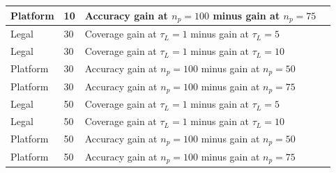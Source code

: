 \begin{longtable}{@{}L{23mm}C{15mm}L{122mm}R{56mm}@{}}
Platform & 10 & Accuracy gain at $n_p=100$ minus gain at $n_p=75$ &  \\
\midrule
Legal & 30 & Coverage gain at $\tau_L=1$ minus gain at $\tau_L=5$ &  \\*
Legal & 30 & Coverage gain at $\tau_L=1$ minus gain at $\tau_L=10$ &  \\
\addlinespace[2pt]
Platform & 30 & Accuracy gain at $n_p=100$ minus gain at $n_p=50$ &  \\*
Platform & 30 & Accuracy gain at $n_p=100$ minus gain at $n_p=75$ &  \\
\midrule
Legal & 50 & Coverage gain at $\tau_L=1$ minus gain at $\tau_L=5$ &  \\*
Legal & 50 & Coverage gain at $\tau_L=1$ minus gain at $\tau_L=10$ &  \\
\addlinespace[2pt]
Platform & 50 & Accuracy gain at $n_p=100$ minus gain at $n_p=50$ &  \\*
Platform & 50 & Accuracy gain at $n_p=100$ minus gain at $n_p=75$ &  \\
\end{longtable}
\endgroup
